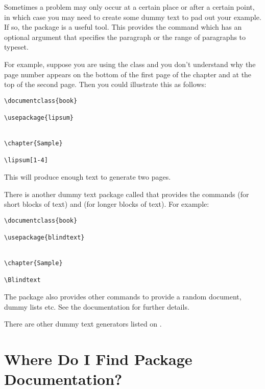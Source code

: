 Sometimes a problem may only occur at a certain place or after a
certain point, in which case you may need to create some dummy text
to pad out your example. If so, the  package is a useful tool.
This provides the command  which has an optional argument
that specifies the paragraph or the range of paragraphs to typeset. 

For example, suppose you are using the  class and you don't
understand why the page number appears on the bottom of the first
page of the chapter and at the top of the second page. Then you
could illustrate this as follows: 
\begin{verbatim}
\documentclass{book}

\usepackage{lipsum}


\chapter{Sample}

\lipsum[1-4]

\end{verbatim}
This will produce enough text to generate two pages. 

There is another dummy text package called  that
provides the commands  (for short blocks of text) and 
 (for longer blocks of text). For example:
\begin{verbatim}
\documentclass{book}

\usepackage{blindtext}


\chapter{Sample}

\Blindtext

\end{verbatim}
The  package also provides other commands to provide
a random document, dummy lists etc. See the 
documentation for further details.

There are other dummy text generators listed on
.

\section{Where Do I Find Package Documentation?}
\label{sec:documentation}


